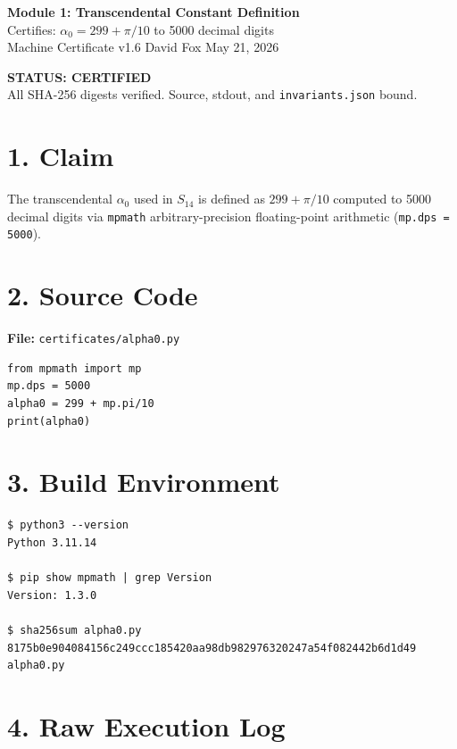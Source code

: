 \documentclass[11pt,letterpaper]{article}
\begin{document}
\begin{center}
{\Large\bfseries Module 1: Transcendental Constant Definition}\\[4pt]
{\large Certifies: $\alpha_0 = 299 + \pi/10$ to 5000 decimal digits}\\[2pt]
{\normalsize Machine Certificate v1.6 \quad David Fox \quad May 21, 2026}
\end{center}
\vspace{0.5em}
\begin{center}
\colorbox{certgreen!15}{\parbox{0.85\textwidth}{\centering
\textcolor{certgreen}{\bfseries STATUS: CERTIFIED \checkmark}\\
All SHA-256 digests verified. Source, stdout, and \texttt{invariants.json} bound.
}}
\end{center}

\section*{1. Claim}

The transcendental $\alpha_0$ used in $S_{14}$ is defined as $299 + \pi/10$ computed to
5000 decimal digits via \texttt{mpmath} arbitrary-precision floating-point arithmetic
(\texttt{mp.dps = 5000}).

\section*{2. Source Code}

\textbf{File:} \texttt{certificates/alpha0.py}
\begin{lstlisting}
from mpmath import mp
mp.dps = 5000
alpha0 = 299 + mp.pi/10
print(alpha0)
\end{lstlisting}

\section*{3. Build Environment}

\begin{lstlisting}
$ python3 --version
Python 3.11.14

$ pip show mpmath | grep Version
Version: 1.3.0

$ sha256sum alpha0.py
8175b0e904084156c249ccc185420aa98db982976320247a54f082442b6d1d49  alpha0.py
\end{lstlisting}

\section*{4. Raw Execution Log}
\end{document}
